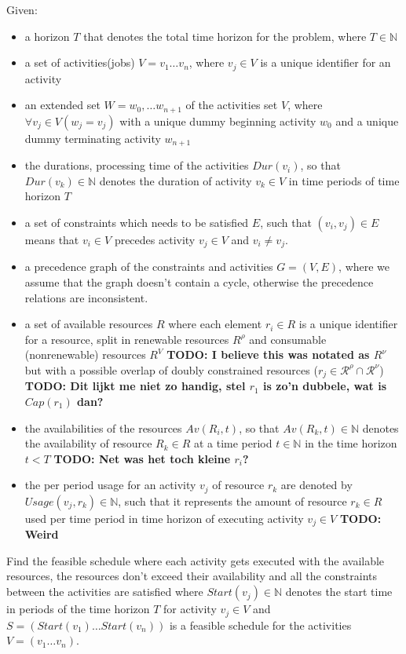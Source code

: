 \documentclass{article}
\newcommand{\TODO}[1]{{\color{red}\textbf{TODO: #1}}}
\newcommand{\renres}[0]{\mathscr{R}^\rho} %
\newcommand{\conres}[0]{\mathscr{R}^\nu} %
\begin{document}
Given:
\begin{itemize}
\item a horizon $T$ that denotes the total time horizon for the problem, where $T \in \mathbb{N}$
\item a set of activities(jobs) $V = v_1 \ldots v_n$, where $v_j \in V$ is a unique identifier for an activity
\item an extended set $W = w_0, \ldots w_{n+1}$ of the activities set $V$, where $\forall v_j \in V (w_j = v_j)$ with a unique dummy beginning activity $w_0$ and a unique dummy terminating activity $w_{n+1}$
\item the durations, processing time of the activities $Dur(v_i)$, so that $Dur(v_k) \in \mathbb{N}$ denotes the duration of activity $v_k \in V$ in time periods of time horizon $T$
\item a set of constraints which needs to be satisfied $E$, such that $(v_i,v_j) \in E$ means that $v_i \in V$ precedes activity $v_j \in V$ and $v_i \neq v_j$.
\item a precedence graph of the constraints and activities $G = (V, E)$, where we assume that the graph doesn't contain a cycle, otherwise the precedence relations are inconsistent.
\item a set of available resources $R$ where each element $r_i \in R$ is a unique identifier for a resource, split in renewable resources $R^{\rho}$ and  consumable (nonrenewable) resources $R^V$ \TODO{I believe this was notated as $R^\nu$} but with a possible overlap of doubly constrained resources ($r_j \in \renres \cap \conres$) \TODO{Dit lijkt me niet zo handig, stel $r_1$ is zo'n dubbele, wat is $Cap(r_1)$ dan?}
\item the availabilities of the resources $Av(R_i, t)$, so that $Av(R_k, t) \in \mathbb{N}$ denotes the availability of resource $R_k \in R$ at a time period $t \in \mathbb{N}$ in the time horizon $t < T$ \TODO{Net was het toch kleine $r_i$?}
\item the per period usage for an activity $v_j$ of resource $r_k$ are denoted by $Usage(v_j, r_k) \in \mathbb{N}$, such that it represents the amount of resource $r_k \in R$ used per time period in time horizon of executing activity $v_j \in V$ \TODO{Weird}
\end{itemize}

Find the feasible schedule where each activity gets executed with the available resources, the resources don't exceed their availability and all the constraints between the activities are satisfied where $Start(v_j) \in \mathbb{N}$ denotes the start time in periods of the time horizon $T$ for activity $v_j \in V$ and
$S = (Start(v_1) \ldots Start(v_n))$ is a feasible schedule for the activities $V = (v_1 \ldots v_n)$.
\end{document}
